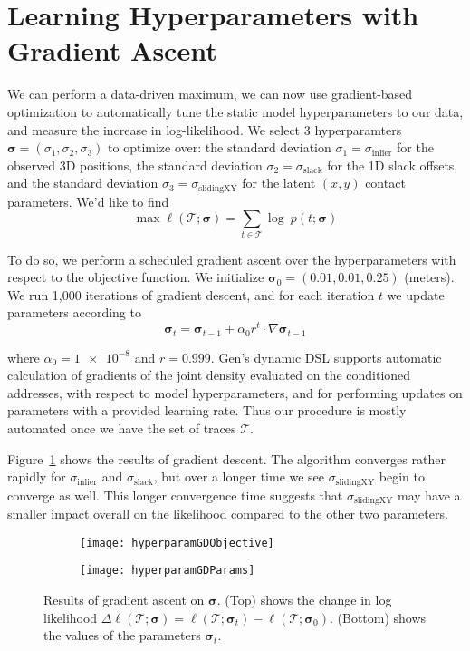 \section{Learning Hyperparameters with Gradient Ascent}
We can perform a data-driven maximum, we can now use gradient-based optimization to automatically tune the static model hyperparameters to our data, and measure the increase in log-likelihood.
We select 3 hyperparamters $\bm{\sigma} = (\sigma_1, \sigma_2, \sigma_3)$ to optimize over: the standard deviation $\sigma_1 = \sigma_\mathrm{inlier}$ for the observed 3D positions, the standard deviation $\sigma_2 = \sigma_\mathrm{slack}$ for the 1D slack offsets, and the standard deviation $\sigma_3 = \sigma_\mathrm{sliding XY}$ for the latent $(x,y)$ contact parameters.
We'd like to find
\[
  \max \ell(\mathcal{T}; \bm{\sigma}) = \sum_{t \in \mathcal{T}} \log\ p(t; \bm{\sigma})
\]

To do so, we perform a scheduled gradient ascent over the hyperparameters with respect to the objective function.
We initialize $\bm{\sigma}_0 = (0.01, 0.01, 0.25)$ (meters).
We run 1,000 iterations of gradient descent, and for each iteration $t$ we update parameters according to
\[
  \bm{\sigma}_t = \bm{\sigma}_{t-1} + \alpha_0 r^{t} \cdot \nabla\bm{\sigma}_{t-1}
\]

where $\alpha_0 = \num{1e-8}$ and $r = 0.999$.
Gen's dynamic DSL supports automatic calculation of gradients of the joint density evaluated on the conditioned addresses, with respect to model hyperparameters, and for performing updates on parameters with a provided learning rate.
Thus our procedure is mostly automated once we have the set of traces $\mathcal{T}$.

Figure~\ref{fig:hyperparamGD} shows the results of gradient descent.
The algorithm converges rather rapidly for $\sigma_\mathrm{inlier}$ and $\sigma_\mathrm{slack}$, but over a longer time we see $\sigma_\mathrm{sliding XY}$ begin to converge as well.
This longer convergence time suggests that $\sigma_\mathrm{sliding XY}$ may have a smaller impact overall on the likelihood compared to the other two parameters.

\raggedbottom
\pagebreak
\flushbottom

\begin{figure}[H]
  \centering
  \begin{subfigure}[b]{0.75\textwidth}
    \centering
    \texttt{[image: hyperparamGDObjective]}
  \end{subfigure}
  \begin{subfigure}[b]{0.75\textwidth}
    \centering
    \texttt{[image: hyperparamGDParams]}
  \end{subfigure}
  \caption{
    Results of gradient ascent on $\bm{\sigma}$.
    (Top) shows the change in log likelihood $\Delta\ell(\mathcal{T}; \bm{\sigma}) = \ell(\mathcal{T}; \bm{\sigma}_t) - \ell(\mathcal{T}; \bm{\sigma}_0)$.
    (Bottom) shows the values of the parameters $\bm{\sigma}_t$.
  }
  \label{fig:hyperparamGD}
\end{figure}



